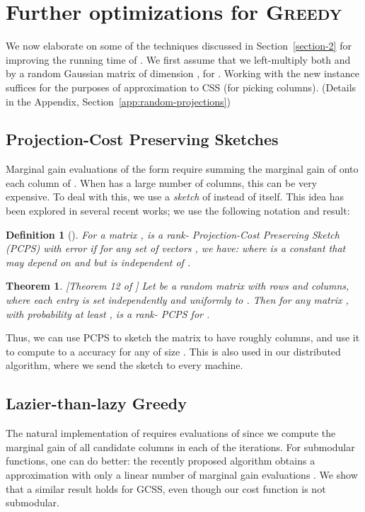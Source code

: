 \documentclass{article}
\newtheorem{defin}{Definition}\newtheorem{thm}{Theorem}\newtheorem{exe}{Exercise}\newtheorem{exa}{Example}\newtheorem{fact}{Fact}\newtheorem{prop}{Proposition}\newtheorem{lemma}{Lemma}\newtheorem{corol}{Corollary}\newtheorem{conj}{Conjecture}\newtheorem{remark}{Remark}\newtheorem{discussion}{Discussion}\newtheorem{conc}{Conclusion}
\newcommand{\greedy}{\textsc{Greedy}}
\newcommand{\gcss}{\textsf{GCSS}}
\begin{document}
\section{Further optimizations for \greedy} \label{section-5}
We now elaborate on some of the techniques discussed in Section~\ref{section-2} for improving the running time of . 
We first assume that we left-multiply both  and  by a random Gaussian matrix of dimension , for . Working with the new instance suffices for the purposes of  approximation to CSS (for picking  columns). (Details in the Appendix, Section~\ref{app:random-projections})









\subsection{Projection-Cost Preserving Sketches}
Marginal gain evaluations of the form  require summing the marginal gain of  onto each column of . When  has a large number of columns, this can be very expensive. To deal with this, we use a {\em sketch} of  instead of  itself. This idea has been explored in several recent works; we use the following notation and result: 

\begin{defin}[\cite{Cohen}] \label{defin:pcps} For a matrix , 
 is a \emph{rank- Projection-Cost Preserving Sketch (PCPS)} with error  if for any set of  vectors , we have: 
where  is a constant that may depend on  and  but is independent of .
\end{defin}

\begin{thm}\label{thm:pcps}[Theorem 12 of \cite{Cohen}]
Let  be a random matrix with  rows and  columns, where each entry is set independently and uniformly to . Then for any matrix , with probability at least ,  is a rank- PCPS for .
\end{thm}

Thus, we can use PCPS to sketch the matrix  to have roughly  columns, and use it to compute  to a  accuracy for any  of size .  This is also used in our distributed algorithm, where we send the sketch to every machine.

\subsection{Lazier-than-lazy Greedy}
The natural implementation of  requires  evaluations of  since we compute the marginal gain of all  candidate columns in each of the  iterations. For submodular functions, one can do better: the recently proposed  algorithm obtains a   approximation with only a linear number  of marginal gain evaluations \cite{Mirzasoleiman}. We show that a similar result holds for \gcss, even though our cost function  is not submodular. 
\end{document}
